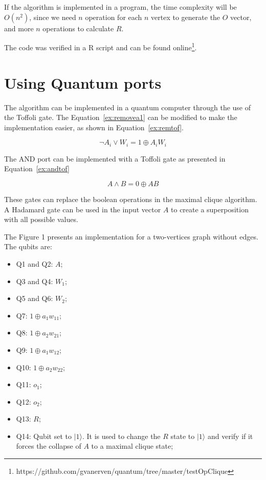 \documentclass[a4paper,12pt]{article}
\begin{document}
If the algorithm is implemented in a program, the time complexity will be $O(n^2)$, since we need $n$ operation for each $n$ vertex to generate the $O$ vector, and more $n$ operations to calculate $R$.

The code was verified in a R script and can be found online\footnote{https://github.com/gvanerven/quantum/tree/master/testOpClique}.
\section{Using Quantum ports}

The algorithm can be implemented in a quantum computer through the use of the Toffoli gate. The Equation~\ref{ex:removea1} can be modified to make the implementation easier, as shown in Equation~\ref{ex:remtof}.

\begin{equation}
	\neg A_i \lor W_i = 1 \oplus A_i W_i \label{ex:remtof}
\end{equation}

The AND port can be implemented with a Toffoli gate as presented in Equation~\ref{ex:andtof} 

\begin{equation}
	A \land B = 0 \oplus AB \label{ex:andtof}
\end{equation}

These gates can replace the boolean operations in the maximal clique algorithm. A Hadamard gate can be used in the input vector $A$ to create a superposition with all possible values.

The Figure 1 presents an implementation for a two-vertices graph without edges. The qubits are:

\begin{itemize}
	\item Q1 and Q2: $A$;
	\item Q3 and Q4: $W_1$;
	\item Q5 and Q6: $W_2$;
	\item Q7: $1 \oplus a_1 w_{11}$;
	\item Q8: $1 \oplus a_2 w_{21}$;
	\item Q9: $1 \oplus a_1 w_{12}$;
	\item Q10: $1 \oplus a_2 w_{22}$;
	\item Q11: $o_{1}$;
	\item Q12: $o_{2}$;
	\item Q13: $R$;
	\item Q14: Qubit set to $|1\rangle$. It is used to change the $R$ state to $|1\rangle$ and verify if it forces the collapse of $A$ to a maximal clique state; 
\end{itemize}
\end{document}
